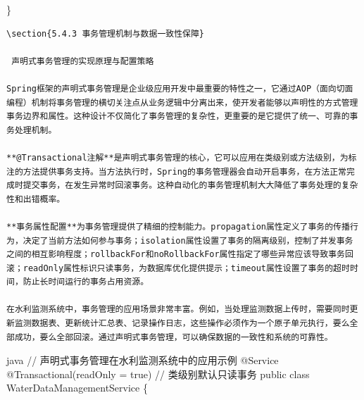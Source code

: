 \}

\begin{lstlisting}
\section{5.4.3 事务管理机制与数据一致性保障}

 声明式事务管理的实现原理与配置策略

Spring框架的声明式事务管理是企业级应用开发中最重要的特性之一，它通过AOP（面向切面编程）机制将事务管理的横切关注点从业务逻辑中分离出来，使开发者能够以声明性的方式管理事务边界和属性。这种设计不仅简化了事务管理的复杂性，更重要的是它提供了统一、可靠的事务处理机制。

**@Transactional注解**是声明式事务管理的核心，它可以应用在类级别或方法级别，为标注的方法提供事务支持。当方法执行时，Spring的事务管理器会自动开启事务，在方法正常完成时提交事务，在发生异常时回滚事务。这种自动化的事务管理机制大大降低了事务处理的复杂性和出错概率。

**事务属性配置**为事务管理提供了精细的控制能力。propagation属性定义了事务的传播行为，决定了当前方法如何参与事务；isolation属性设置了事务的隔离级别，控制了并发事务之间的相互影响程度；rollbackFor和noRollbackFor属性指定了哪些异常应该导致事务回滚；readOnly属性标识只读事务，为数据库优化提供提示；timeout属性设置了事务的超时时间，防止长时间运行的事务占用资源。

在水利监测系统中，事务管理的应用场景非常丰富。例如，当处理监测数据上传时，需要同时更新监测数据表、更新统计汇总表、记录操作日志，这些操作必须作为一个原子单元执行，要么全部成功，要么全部回滚。通过声明式事务管理，可以确保数据的一致性和系统的可靠性。
\end{lstlisting}

java // 声明式事务管理在水利监测系统中的应用示例 @Service @Transactional(readOnly = true) // 类级别默认只读事务 public class WaterDataManagementService \{

